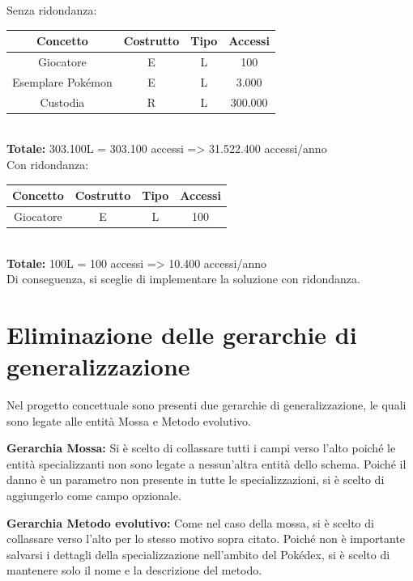 \documentclass[a4paper,12pt]{report}
\begin{document}
Senza ridondanza:  \\

\begin{tabular}{|c|c|c|c|}
  \hline
  \rowcolor{gray!30}Concetto & Costrutto & Tipo & Accessi \\
  \hline
  Giocatore & E & L & 100 \\
  \hline
  Esemplare Pokémon & E & L & 3.000 \\
  \hline
  Custodia & R & L & 300.000 \\
  \hline
\end{tabular} \\
  
\textbf{Totale:} 303.100L = 303.100 accessi => 31.522.400 accessi/anno \\

Con ridondanza:  \\

\begin{tabular}{|c|c|c|c|}
  \hline
  \rowcolor{gray!30}Concetto & Costrutto & Tipo & Accessi \\
  \hline
  Giocatore & E & L & 100 \\
  \hline
\end{tabular} \\
  
\textbf{Totale:} 100L = 100 accessi => 10.400 accessi/anno \\

Di conseguenza, si sceglie di implementare la soluzione con ridondanza.

\section{Eliminazione delle gerarchie di generalizzazione}

Nel progetto concettuale sono presenti due gerarchie di generalizzazione, le quali sono legate alle entità Mossa e Metodo evolutivo.

\textbf{Gerarchia Mossa:} Si è scelto di collassare tutti i campi verso l'alto poiché le entità specializzanti non sono legate a nessun'altra entità dello schema. Poiché il danno è un parametro non presente in tutte le specializzazioni, si è scelto di aggiungerlo come campo opzionale.

\textbf{Gerarchia Metodo evolutivo:} Come nel caso della mossa, si è scelto di collassare verso l'alto per lo stesso motivo sopra citato. Poiché non è importante salvarsi i dettagli della specializzazione nell'ambito del Pokédex, si è scelto di mantenere solo il nome e la descrizione del metodo.
\end{document}
